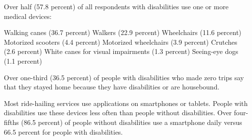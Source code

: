 \documentclass[]{article}
\begin{document}
Over half (57.8 percent) of all respondents with disabilities use one or
more medical devices:

Walking canes (36.7 percent) Walkers (22.9 percent) Wheelchairs (11.6
percent) Motorized scooters (4.4 percent) Motorized wheelchairs (3.9
percent) Crutches (2.6 percent) White canes for visual impairments (1.3
percent) Seeing-eye dogs (1.1 percent)

Over one-third (36.5 percent) of people with disabilities who made zero
trips say that they stayed home because they have disabilities or are
housebound.

Most ride-hailing services use applications on smartphones or tablets.
People with disabilities use these devices less often than people
without disabilities. Over four-fifths (86.5 percent) of people without
disabilities use a smartphone daily versus 66.5 percent for people with
disabilities.
\end{document}

